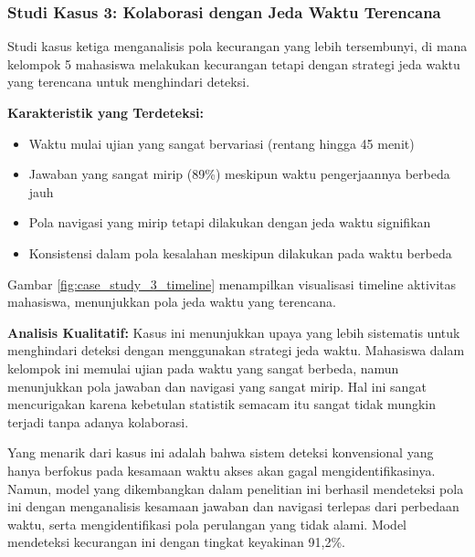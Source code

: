 \subsubsection{Studi Kasus 3: Kolaborasi dengan Jeda Waktu Terencana}

Studi kasus ketiga menganalisis pola kecurangan yang lebih tersembunyi, di mana kelompok 5 mahasiswa melakukan kecurangan tetapi dengan strategi jeda waktu yang terencana untuk menghindari deteksi.

\textbf{Karakteristik yang Terdeteksi:}
\begin{itemize}
    \item Waktu mulai ujian yang sangat bervariasi (rentang hingga 45 menit)
    \item Jawaban yang sangat mirip (89\%) meskipun waktu pengerjaannya berbeda jauh
    \item Pola navigasi yang mirip tetapi dilakukan dengan jeda waktu signifikan
    \item Konsistensi dalam pola kesalahan meskipun dilakukan pada waktu berbeda
\end{itemize}

Gambar \ref{fig:case_study_3_timeline} menampilkan visualisasi timeline aktivitas mahasiswa, menunjukkan pola jeda waktu yang terencana.


\textbf{Analisis Kualitatif:}
Kasus ini menunjukkan upaya yang lebih sistematis untuk menghindari deteksi dengan menggunakan strategi jeda waktu. Mahasiswa dalam kelompok ini memulai ujian pada waktu yang sangat berbeda, namun menunjukkan pola jawaban dan navigasi yang sangat mirip. Hal ini sangat mencurigakan karena kebetulan statistik semacam itu sangat tidak mungkin terjadi tanpa adanya kolaborasi.

Yang menarik dari kasus ini adalah bahwa sistem deteksi konvensional yang hanya berfokus pada kesamaan waktu akses akan gagal mengidentifikasinya. Namun, model yang dikembangkan dalam penelitian ini berhasil mendeteksi pola ini dengan menganalisis kesamaan jawaban dan navigasi terlepas dari perbedaan waktu, serta mengidentifikasi pola perulangan yang tidak alami. Model mendeteksi kecurangan ini dengan tingkat keyakinan 91,2\%.

